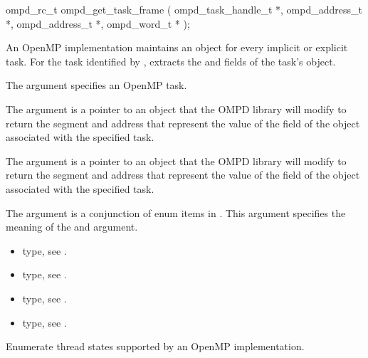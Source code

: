 \format
\begin{cspecific}
\begin{ompSyntax}
ompd_rc_t ompd_get_task_frame (
  ompd_task_handle_t *,
  ompd_address_t *,
  ompd_address_t *,
  ompd_word_t *
);
\end{ompSyntax}
\end{cspecific}

\descr
An OpenMP implementation  maintains an  object for every implicit or explicit task.
For the task identified by ,  extracts
the  and  fields of the task's  object.

\argdesc

The argument  specifies an OpenMP task.

The argument  is a pointer to an  object that the OMPD library will
modify to return the segment and address that represent the value of the 
field of the  object associated with the specified task.

The argument  is a pointer to an  object that the OMPD library will
modify to return the segment and address that represent the value of the 
field of the  object associated with the specified task.

The  argument is a conjunction of enum items in
. This argument specifies the meaning of the 
 and  argument.

\crossreferences
\begin{itemize}
	\item {} type, see .
	\item {} type, see .
	\item {} type, see .
	\item {} type, see .
\end{itemize}


\label{subsubsubsec:ompd_enumerate_states}

\summary
Enumerate thread states supported by an OpenMP implementation.

